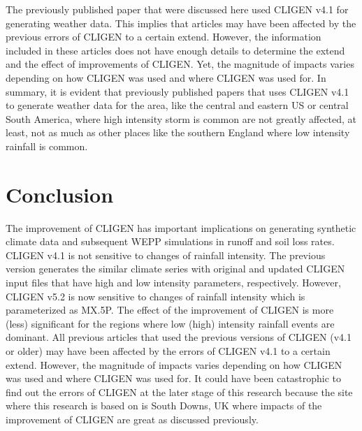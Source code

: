 The previously published paper that were discussed here used CLIGEN v4.1 for
generating weather data. This implies that articles may have been affected by
the previous errors of CLIGEN to a certain extend. However, the information
included in these articles does not have enough details to determine the extend
and the effect of improvements of CLIGEN. Yet, the magnitude of impacts varies
depending on how CLIGEN was used and where CLIGEN was used for. In summary,
it is evident that previously published papers that uses CLIGEN v4.1 to
generate weather data for the area, like the central and eastern US or central
South America, where high intensity storm is common are not greatly affected,
at least, not as much as other places like the southern England where low
intensity rainfall is common.

\section{Conclusion}
\label{sec:ImprovedCLIGENConclusion}
The improvement of CLIGEN has important implications on generating synthetic
climate data and subsequent WEPP simulations in runoff and soil loss rates.
CLIGEN v4.1 is not sensitive to changes of rainfall intensity. The previous
version generates the similar climate series with original and updated CLIGEN
input files that have high and low intensity parameters, respectively. However,
CLIGEN v5.2 is now sensitive to changes of rainfall intensity which is
parameterized as {MX.5P}. The effect of the improvement of CLIGEN is more
(less) significant for the regions where low (high) intensity rainfall events
are dominant.
All previous articles that used the previous versions of CLIGEN (v4.1 or older)
may have been affected by the errors of CLIGEN v4.1 to a certain extend.
However, the magnitude of impacts varies depending on how CLIGEN was used and
where CLIGEN was used for. It could have been catastrophic to find out the
errors of CLIGEN at the later stage of this research because the site where this
research is based on is South Downs, UK where impacts of the improvement of
CLIGEN are great as discussed previously.


